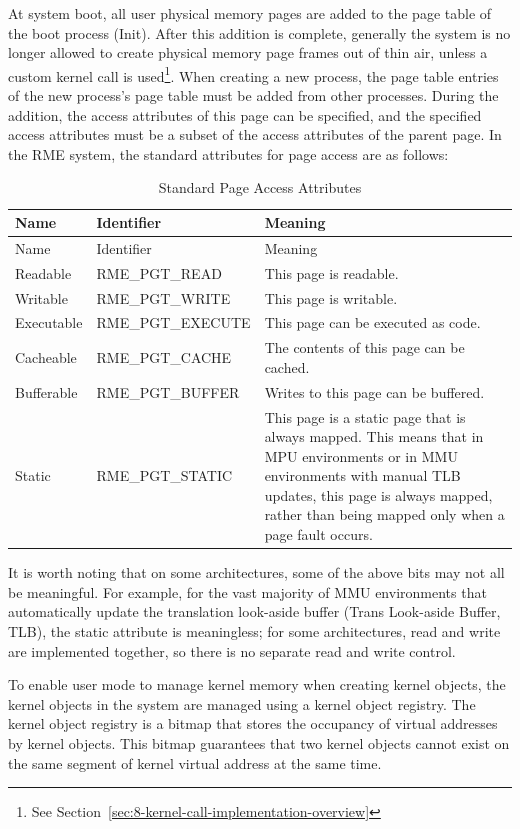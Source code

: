 At system boot, all user physical memory pages are added to the page table of the boot process (Init). After this addition is complete, generally the system is no longer allowed to create physical memory page frames out of thin air, unless a custom kernel call is used\footnote{See Section~\ref{sec:8-kernel-call-implementation-overview}}. When creating a new process, the page table entries of the new process's page table must be added from other processes. During the addition, the access attributes of this page can be specified, and the specified access attributes must be a subset of the access attributes of the parent page. In the RME system, the standard attributes for page access are as follows:

\begin{xltabular}{\textwidth}{@{}>{\hsize\raggedright\arraybackslash}X>{\hsize\raggedright\arraybackslash}X>{\hsize\raggedright\arraybackslash}X@{}}
\caption{Standard Page Access Attributes}\label{tab:3-2-standard-page-access-attributes}\\
\toprule
Name & Identifier & Meaning\tabularnewline
\endfirsthead
\toprule
Name & Identifier & Meaning\tabularnewline
\midrule
\endhead
\bottomrule
\endlastfoot
Readable & RME\_PGT\_READ & This page is readable.\tabularnewline
Writable & RME\_PGT\_WRITE & This page is writable.\tabularnewline
Executable & RME\_PGT\_EXECUTE &
This page can be executed as code.\tabularnewline
Cacheable & RME\_PGT\_CACHE & The contents of this page can be cached.\tabularnewline
Bufferable & RME\_PGT\_BUFFER & Writes to this page can be buffered.\tabularnewline
Static & RME\_PGT\_STATIC &
This page is a static page that is always mapped. This means that in MPU environments or in MMU environments with manual TLB updates, this page is always mapped, rather than being mapped only when a page fault occurs.\tabularnewline
\end{xltabular}
\nopagebreak[4]

It is worth noting that on some architectures, some of the above bits may not all be meaningful. For example, for the vast majority of MMU environments that automatically update the translation look-aside
buffer (Trans
Look-aside
Buffer, TLB), the static attribute is meaningless; for some architectures, read and write are implemented together, so there is no separate read and write control.

To enable user mode to manage kernel memory when creating kernel objects, the kernel objects in the system are managed using a kernel object registry. The kernel object registry is a bitmap that stores the occupancy of virtual addresses by kernel objects. This bitmap guarantees that two kernel objects cannot exist on the same segment of kernel virtual address at the same time.

